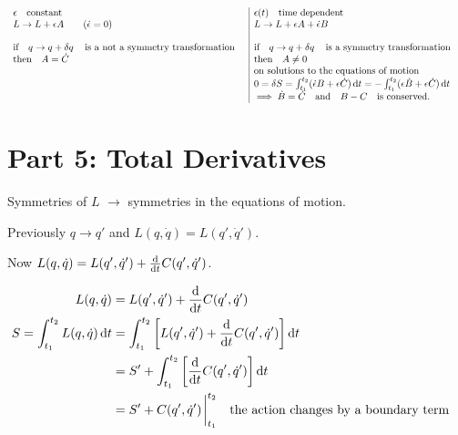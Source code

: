 \documentclass{article}
\begin{document}
\[
    \begin{array}{l|l}
        \epsilon \qq{constant}                                       & \epsilon(t)\qq{time dependent}                                                                                               \\
        L\to L+\epsilon A \qquad(\dot{\epsilon}=0)                   & L\to L+\epsilon A+\dot{\epsilon}B                                                                                            \\
                                                                     &                                                                                                                              \\
        \qif* q\to q+\var{q} \qq{is a not a symmetry transformation} & \qif* q\to q+\var{q} \qq{is a symmetry transformation}                                                                       \\
        \qthen*   A=\dot{C}                                          & \qthen*  A\neq 0                                                                                                             \\
                                                                     & \qq*{on solutions to the equations of motion}                                                                                \\
                                                                     & 0=\var{S}=\int_{t_1}^{t_2}(\dot{\epsilon}B+\epsilon \dot{C})\dd{t}=-\int_{t_1}^{t_2}(\epsilon\dot{B}+\epsilon \dot{C})\dd{t} \\
                                                                     & \implies  \dot{B}=\dot{C}\qand B-C \qq{is  conserved.}                                                                       \\
    \end{array}
\]


\section*{Part 5: Total Derivatives}
Symmetries of $L$ $\to$ symmetries in the equations of motion.

Previously $q\to q'$ and $L(q,\dot{q})=L(q',\dot{q}')$.

Now $L(q,\dot{q})=L(q',\dot{q}')+\dv{t}C(q',\dot{q}')$.


\begin{align*}
    L(q,\dot{q})                          & =L(q',\dot{q}')+\dv{t}C(q',\dot{q}')                                           \\
    S=\int_{t_1}^{t_2} L(q,\dot{q})\dd{t} & =\int_{t_1}^{t_2}\bqty{L(q',\dot{q}')+\dv{t}C(q',\dot{q}')}\dd{t}              \\
                                          & =S'+\int_{t_1}^{t_2}\bqty{\dv{t}C(q',\dot{q}')}\dd{t}                          \\
                                          & =S'+C(q',\dot{q}')\eval_{t_1}^{t_2} \qq{the action changes by a boundary term} \\
\end{align*}
\end{document}
